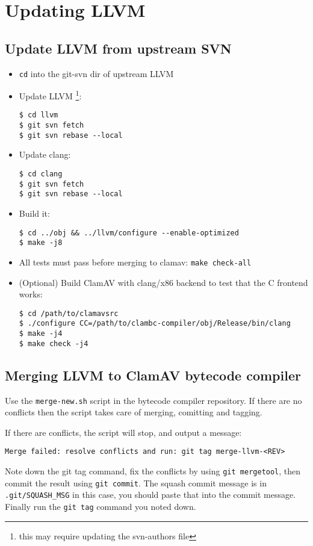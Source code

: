 \chapter{Updating LLVM}
\section{Update LLVM from upstream SVN}
\begin{itemize}
\item \verb+cd+ into the git-svn dir of upstream LLVM
\item Update LLVM \footnote{this may require updating the svn-authors file}:
\begin{verbatim}
$ cd llvm
$ git svn fetch
$ git svn rebase --local
\end{verbatim}
\item Update clang:
\begin{verbatim}
$ cd clang
$ git svn fetch
$ git svn rebase --local
\end{verbatim}
\item Build it:
\begin{verbatim}
$ cd ../obj && ../llvm/configure --enable-optimized
$ make -j8
\end{verbatim}
\item All tests must pass before merging to clamav: \verb+make check-all+
\item (Optional) Build ClamAV with clang/x86 backend to test that the C frontend
works:
\begin{verbatim}
$ cd /path/to/clamavsrc
$ ./configure CC=/path/to/clambc-compiler/obj/Release/bin/clang
$ make -j4
$ make check -j4
\end{verbatim}
\end{itemize}

\section{Merging LLVM to ClamAV bytecode compiler}
Use the \verb+merge-new.sh+ script in the bytecode compiler repository.
If there are no conflicts then the script takes care of merging, comitting and
tagging.

If there are conflicts, the script will stop, and output a message:

\verb+Merge failed: resolve conflicts and run: git tag merge-llvm-<REV>+

Note down the git tag command, fix the conflicts by using \verb+git mergetool+, then
commit the result using \verb+git commit+. The squash commit message is in \verb+.git/SQUASH_MSG+ in this case,
you should paste that into the commit message.
Finally run the \verb+git tag+ command you noted down.

